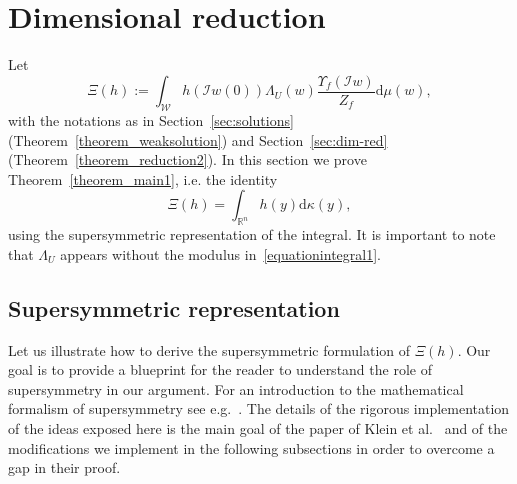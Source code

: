 \documentclass[a4paper,10pt]{article}
\newcommand{\assign}{:=}
\newcommand{\mathd}{\mathrm{d}}
\begin{document}
\section{Dimensional reduction}\label{sec:super}

Let
\begin{equation}
  \Xi (h) \assign \int_{\mathcal{W}} h (\mathcal{I}w (0)) \Lambda_U (w)
  \frac{\Upsilon_f (\mathcal{I}w)}{Z_f} \mathd \mu (w),
  \label{equationintegral1}
\end{equation}
with the notations as in Section~\ref{sec:solutions}
(Theorem~\ref{theorem_weaksolution}) and Section~\ref{sec:dim-red}
(Theorem~\ref{theorem_reduction2}). In this section we prove
Theorem~\ref{theorem_main1}, i.e. the identity
\begin{equation}
  \Xi (h) = \int_{\mathbb{R}^n} h (y) \mathd \kappa (y), \label{eq:main}
\end{equation}
using the supersymmetric representation of the integral. It is important to
note that $\Lambda_U$ appears without the modulus
in~{\eqref{equationintegral1}}.

\subsection{Supersymmetric representation}\label{section_supersymmetry}

Let us illustrate how to derive the supersymmetric formulation of $\Xi (h)$.
Our goal is to provide a blueprint for the reader to understand the role of
supersymmetry in our argument. For an introduction to the mathematical
formalism of supersymmetry see
e.g.~{\cite{dewitt_supermanifolds_1992,arai_supersymmetric_1993,rogers_supermanifolds_2007,de_goursac_noncommutative_2015}}.
The details of the rigorous implementation of the ideas exposed here is the
main goal of the paper of Klein et al.~{\cite{Klein1984}} and of the
modifications we implement in the following subsections in order to overcome a
gap in their proof.

\
\end{document}
